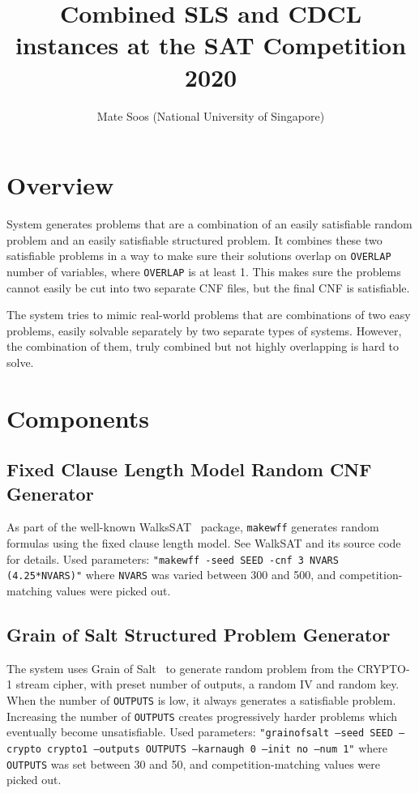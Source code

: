\documentclass[final]{ieee}
\begin{document}
\title{Combined SLS and CDCL instances at the SAT Competition 2020}
\author{Mate Soos (National University of Singapore)}

\maketitle
\thispagestyle{empty}
\pagestyle{empty}



\section{Overview}
System generates problems that are a combination of an easily satisfiable random problem and an easily satisfiable structured problem. It combines these two satisfiable problems in a way to make sure their solutions overlap on \texttt{OVERLAP} number of variables, where \texttt{OVERLAP} is at least 1. This makes sure the problems cannot easily be cut into two separate CNF files, but the final CNF is satisfiable.

The system tries to mimic real-world problems that are combinations of two easy problems, easily solvable separately by two separate types of systems. However, the combination of them, truly combined but not highly overlapping is hard to solve.


\section{Components}


\subsection{Fixed Clause Length Model Random CNF Generator}
As part of the well-known WalksSAT~\cite{Selman95localsearch} package, \texttt{makewff} generates random formulas using the fixed clause length model. See WalkSAT and its source code for details. Used parameters: \texttt{"makewff -seed SEED -cnf 3 NVARS (4.25*NVARS)"} where \texttt{NVARS} was varied between 300 and 500, and competition-matching values were picked out.

\subsection{Grain of Salt Structured Problem Generator}
The system uses Grain of Salt~\cite{soos2010grain} to generate random problem from the CRYPTO-1 stream cipher, with preset number of outputs, a random IV and random key. When the number of \texttt{OUTPUTS} is low, it always generates a satisfiable problem. Increasing the number of \texttt{OUTPUTS} creates progressively harder problems which eventually become unsatisfiable. Used parameters: \texttt{"grainofsalt --seed SEED --crypto crypto1 --outputs OUTPUTS --karnaugh 0 --init no --num 1"} where \texttt{OUTPUTS} was set between 30 and 50, and competition-matching values were picked out.
\end{document}
